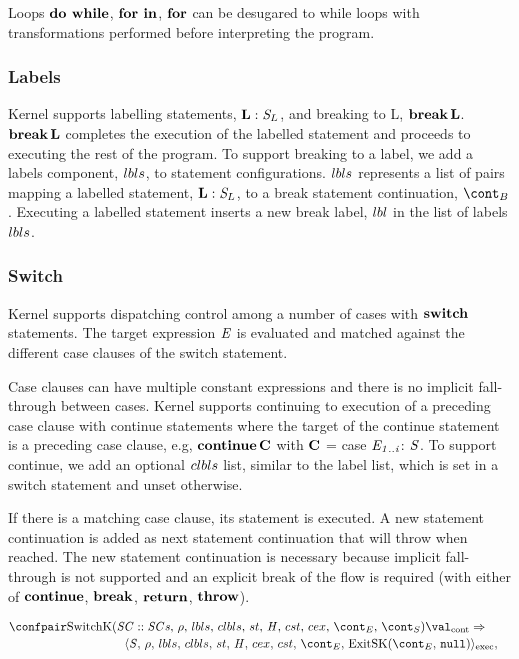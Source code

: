 \documentclass[a4paper,oneside]{article}
\newcommand{\synt}[1]{\ensuremath{\text{\textbf{#1}}}}
\DeclareMathOperator{\dowhile}{\synt{do~while}}
\DeclareMathOperator{\forin}{\synt{for~in}}
\DeclareMathOperator{\for}{\synt{for}}
\DeclareMathOperator{\throw}{\synt{throw}}
\DeclareMathOperator{\bbreak}{\synt{break}}
\DeclareMathOperator{\switch}{\synt{switch}}
\DeclareMathOperator{\continue}{\synt{continue}}
\DeclareMathOperator{\return}{\synt{return}}
\newcommand{\cesktranssplit}[2]{\ensuremath{{#1} \Rightarrow\\ {#2}}}
\begin{document}
Loops $\dowhile$, $\forin$, $\for$ can be desugared to while loops with transformations performed before interpreting the program.


\subsubsection{Labels}

Kernel supports labelling statements, $\synt{L}: \stmt_{L}$, and breaking to L, $\bbreak \synt{L}$.
$\bbreak \synt{L}$ completes the execution of the labelled statement and proceeds to executing the rest of the program.
To support breaking to a label, we add a labels component, $lbls$, to statement configurations.
$lbls$ represents a list of pairs mapping a labelled statement, $\synt{L}: \stmt_L$, to a break statement continuation, $\bcont$.
Executing a labelled statement inserts a new break label, $lbl$ in the list of labels $lbls$.


\subsubsection{Switch}

Kernel supports dispatching control among a number of cases with $\switch$ statements.
The target expression $\mathit{E}$ is evaluated and matched against the different case clauses of the switch statement.

Case clauses can have multiple constant expressions and there is no implicit fall-through between cases.
Kernel supports continuing to execution of a preceding case clause with continue statements where the target of the continue statement is a preceding case clause, e.g, $\continue \synt{C}$ with $\synt{C}$ = case $\mathit{E}_\mathit{1..i}$: $\mathit{S}$.
To support continue, we add an optional $clbls$ list, similar to the label list, which is set in a switch statement and unset otherwise.

If there is a matching case clause, its statement is executed.
A new statement continuation is added as next statement continuation that will throw when reached.
The new statement continuation is necessary because implicit fall-through is not supported and an explicit break of the flow is required (with either of $\continue$, $\bbreak$, $\return$, $\throw$).

\begin{align*}
    &\begin{multlined}
        \cesktranssplit%
            {\contconf{\SwitchK{\scase :: \scases}{\clbls}}{\val}}%
            {\execconf{\stmt}{\env}{\lbls}{\clbls}{\strace}{\handler}{\cex,\,\cstrace}{\econt}{\ExitSK{\tt{null}}}},
    \end{multlined}
\end{align*}
\end{document}
